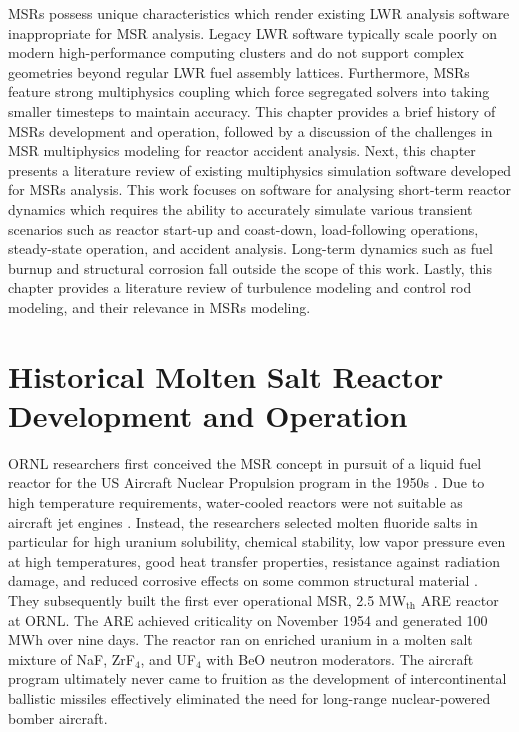 \glspl{MSR} possess unique characteristics which render existing \gls{LWR}
analysis software inappropriate for \gls{MSR} analysis. Legacy \gls{LWR}
software typically scale poorly on modern high-performance computing
clusters and do not support complex geometries beyond regular \gls{LWR} fuel
assembly lattices. Furthermore, \glspl{MSR} feature strong multiphysics
coupling which force segregated solvers into taking smaller timesteps to
maintain accuracy. This chapter provides a brief history of \glspl{MSR}
development and operation, followed by a discussion of the challenges in
\gls{MSR} multiphysics modeling
for reactor accident analysis. Next, this chapter presents a literature
review of existing multiphysics simulation software developed for \glspl{MSR}
analysis. This work focuses on software for analysing short-term reactor
dynamics which requires the ability to accurately simulate various transient
scenarios such as reactor start-up and coast-down, load-following operations,
steady-state operation, and accident analysis. Long-term dynamics such as fuel
burnup and structural corrosion fall outside the scope of this work. Lastly,
this chapter provides a literature review of turbulence modeling and control
rod modeling, and their relevance in \glspl{MSR} modeling.

\section{Historical Molten Salt Reactor Development and Operation}

\gls{ORNL} researchers first conceived the \gls{MSR} concept in pursuit of a
liquid fuel reactor for the US Aircraft Nuclear Propulsion program in
the 1950s \cite{rosenthal_molten-salt_1970}. Due to high temperature
requirements, water-cooled reactors were not suitable as aircraft jet engines
\cite{dolan_1_2017}. Instead, the researchers selected molten fluoride
salts in particular for high uranium solubility, chemical stability, low vapor
pressure even at high temperatures, good heat transfer properties,
resistance against radiation damage, and reduced corrosive effects on some
common structural material \cite{rosenthal_molten-salt_1970}. They
subsequently built the first ever operational \gls{MSR}, 2.5 MW$_{\text{th}}$
\gls{ARE} reactor at \gls{ORNL}. The \gls{ARE}
achieved criticality on November 1954 and generated 100 MWh over nine days.
The reactor ran on enriched uranium in a molten salt mixture of NaF,
ZrF$_4$, and UF$_4$ with BeO neutron moderators. The aircraft program
ultimately never came to fruition as the development of intercontinental
ballistic missiles effectively eliminated the need for long-range
nuclear-powered bomber aircraft.

